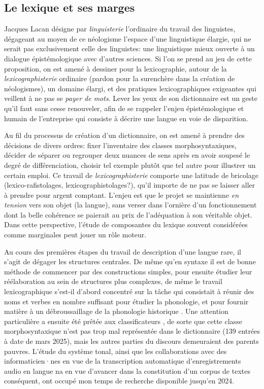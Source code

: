 \subsection{Le lexique et ses marges}
\label{sec:marges}
Jacques Lacan désigne par \emph{linguisterie} l'ordinaire du travail des linguistes, dégageant au moyen de ce néologisme l'espace d'une linguistique élargie, qui ne serait pas exclusivement celle des linguistes: une linguistique mieux ouverte à un dialogue épistémologique avec d'autres sciences. Si l'on se prend au jeu de cette proposition, on est amené à dessiner pour la lexicographie, autour de la \emph{lexicographisterie} ordinaire (pardon pour la surenchère dans la création de néologismes), un domaine élargi, et des pratiques lexicographiques exigeantes qui veillent à ne pas se \emph{payer de mots}. Lever les yeux de son dictionnaire est un geste qu'il faut sans cesse renouveler, afin de se rappeler l’enjeu épistémologique et humain de l’entreprise qui consiste à décrire une langue en voie de disparition.

Au fil du processus de création d'un dictionnaire, on est amené à prendre des décisions de divers ordres: fixer l'inventaire des classes morphosyntaxiques, décider de séparer ou regrouper deux nuances de sens après en avoir soupesé le degré de différenciation, choisir tel exemple plutôt que tel autre pour illustrer un certain emploi. Ce travail de \emph{lexicographisterie} comporte une latitude de bricolage (lexico-rafistolages, lexicographistolages?), qu'il importe de ne pas se laisser aller à prendre pour argent comptant. L'enjeu est que le projet se maintienne \emph{en tension} vers son objet (la langue), sans verser dans l'ornière d'un fonctionnement dont la belle cohérence se paierait au prix de l'adéquation à son véritable objet. Dans cette perspective, l'étude de composantes du lexique souvent considérées comme marginales peut jouer un rôle moteur.

Au cours des premières étapes du travail de description d'une langue rare, il s'agit de dégager les structures centrales. De même qu'en syntaxe il est de bonne méthode de commencer par des constructions simples, pour ensuite étudier leur réélaboration au sein de structures plus complexes, de même le travail lexicographique s'est-il d'abord concentré sur la tâche qui consistait à réunir des noms et verbes en nombre suffisant pour étudier la phonologie, et pour fournir matière à un débroussaillage de la phonologie historique \parencite{jacquesetal2011}. Une attention particulière a ensuite été prêtée aux classificateurs \parencite{michaud2011c,michaud2013d}, de sorte que cette classe morphosyntaxique n'est pas trop mal représentée dans le dictionnaire (139 entrées à date de mars 2025), mais les autres parties du discours demeuraient des parents pauvres. L'étude du système tonal, ainsi que les collaborations avec des informaticien·nes en vue de la transcription automatique d'enregistrements audio en langue na \parencite{michaudetal2018integrating,guillaume_plugging_2022} en vue d'avancer dans la constitution d'un corpus de textes conséquent, ont occupé mon temps de recherche disponible jusqu'en 2024.

